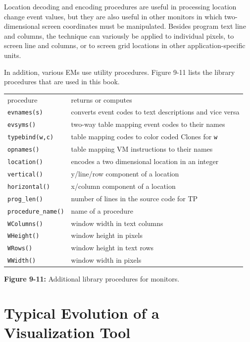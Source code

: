 Location decoding and encoding procedures are useful in processing 
location change event values, but they are also useful in other monitors
in which two-dimensional screen coordinates must be manipulated.
Besides program text line and columns, the technique can variously be
applied to individual pixels, to screen line and columns, or to screen
grid locations in other application-specific units.

In addition, various EMs use utility procedures.  Figure 9-11 lists the
library procedures that are used in this book.

\begin{center}
\medskip

\begin{tabular}{|ll|} \hline
procedure  & returns or computes \\
{\tt evnames(s)} & converts event codes to text descriptions and vice versa\\
{\tt evsyms()} & two-way table mapping event codes to their names \\
{\tt typebind(w,c)} & table mapping codes to color coded Clones for {\tt w}\\
{\tt opnames()} & table mapping VM instructions to their names \\
{\tt location()} & encodes a two dimensional location in an integer \\
{\tt vertical()} & y/line/row component of a location \\
{\tt horizontal()} & x/column component of a location \\
{\tt prog\_len()} & number of lines in the source code for TP \\
{\tt procedure\_name()} & name of a procedure \\
{\tt WColumns()} & window width in text columns \\
{\tt WHeight()} & window height in pixels \\
{\tt WRows()} & window height in text rows \\
{\tt WWidth()} & window width in pixels \\
\hline
\end{tabular}

\end{center}
{\sffamily\bfseries Figure 9-11:}
{\sffamily Additional library procedures for monitors.}


\section{Typical Evolution of a Visualization Tool}

